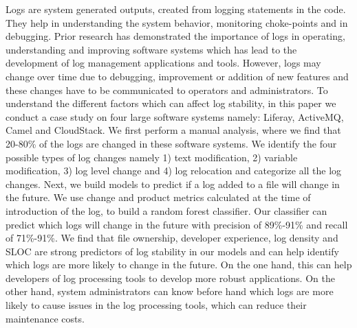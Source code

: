 Logs are system generated outputs, created from logging statements in the code. They help in understanding the system behavior, monitoring choke-points and in debugging. Prior research has demonstrated the importance of logs in operating, understanding and improving software systems which has lead to the development of log management applications and tools. However, logs may change over time due to debugging, improvement or addition of new features and these changes have to be communicated to operators and administrators. To understand the different factors which can affect log stability, in this paper we conduct a case study on four large software systems namely: Liferay, ActiveMQ, Camel and CloudStack. We first perform a manual analysis, where we find that 20-80\% of the logs are changed in these software systems. We identify the four possible types of log changes namely 1) text modification, 2) variable modification, 3) log level change and 4) log relocation and categorize all the log changes. Next, we build models to predict if a log added to a file will change in the future. We use change and product  metrics calculated at the time of introduction of the log, to build a random forest classifier. Our classifier can predict which logs will change in the future with precision of 89\%-91\% and recall of 71\%-91\%. We find that file ownership, developer experience, log density and SLOC are strong predictors of log stability in our models and can help identify which logs are more likely to change in the future. On the one hand, this can help developers of log processing tools to develop more robust applications. On the other hand, system administrators can know before hand which logs are more likely to cause issues in the log processing tools, which can reduce their maintenance costs.
